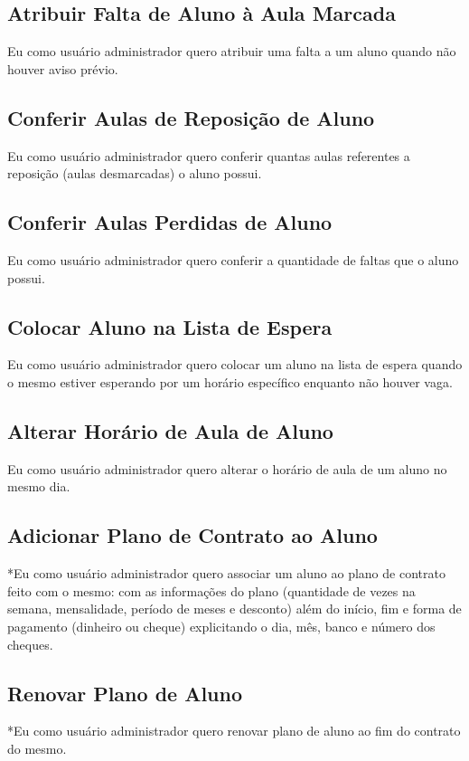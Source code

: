 \subsection[Atribuir Falta de Aluno à Aula Marcada]{Atribuir Falta de Aluno à Aula Marcada}
Eu como usuário administrador quero atribuir uma falta a um aluno quando não
houver aviso prévio.

\subsection[Conferir Aulas de Reposição de Aluno]{Conferir Aulas de Reposição de Aluno}
Eu como usuário administrador quero conferir quantas aulas referentes a
reposição (aulas desmarcadas) o aluno possui.

\subsection[Conferir Aulas Perdidas de Aluno]{Conferir Aulas Perdidas de Aluno}
Eu como usuário administrador quero conferir a quantidade de faltas que o aluno
possui.

\subsection[Colocar Aluno na Lista de Espera]{Colocar Aluno na Lista de Espera}
Eu como usuário administrador quero colocar um aluno na lista de espera quando o
mesmo estiver esperando por um horário específico enquanto não houver vaga.

\subsection[Alterar Horário de Aula de Aluno]{Alterar Horário de Aula de Aluno}
Eu como usuário administrador quero alterar o horário de aula de um aluno no
mesmo dia.

\subsection[Adicionar Plano de Contrato ao Aluno]{Adicionar Plano de Contrato ao Aluno}
*Eu como usuário administrador quero associar um aluno ao plano de contrato feito
com o mesmo: com as informações do plano (quantidade de vezes na semana,
mensalidade, período de meses e desconto) além do início, fim e forma de
pagamento (dinheiro ou cheque) explicitando o dia, mês, banco e número dos
cheques.

\subsection[Renovar Plano de Aluno]{Renovar Plano de Aluno}
*Eu como usuário administrador quero renovar plano de aluno ao fim do
contrato do mesmo.

